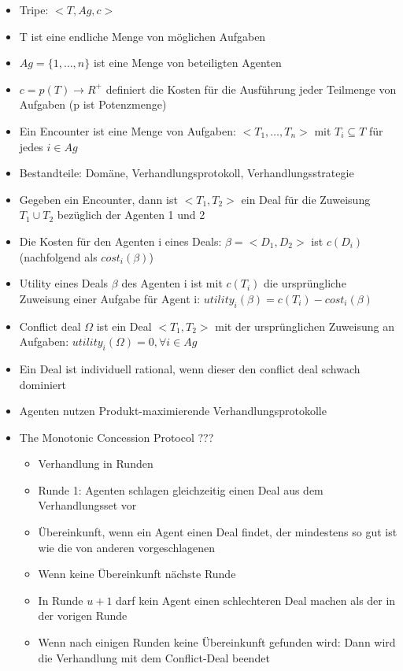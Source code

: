 \documentclass{article} %
\begin{document}
	\begin{itemize}
		\item Tripe: $<T,Ag,c>$
		\item T ist eine endliche Menge von möglichen Aufgaben
		\item $Ag=\{1,\dots,n\}$ ist eine Menge von beteiligten Agenten
		\item $c = p(T) \rightarrow R^+$ definiert die Kosten für die Ausführung jeder Teilmenge von Aufgaben (p ist Potenzmenge)
		\item Ein Encounter ist eine Menge von Aufgaben: $<T_1,\dots,T_n>$ mit $T_i \subseteq T$ für jedes $i \in Ag$
		\item Bestandteile: Domäne, Verhandlungsprotokoll, Verhandlungsstrategie
		\item Gegeben ein Encounter, dann ist $<T_1,T_2>$ ein Deal für die Zuweisung $T_1 \cup T_2$ bezüglich der Agenten 1 und 2
		\item Die Kosten für den Agenten i eines Deals: $\beta = <D_1,D_2>$ ist $c(D_i)$ (nachfolgend als $cost_i(\beta)$)
		\item Utility eines Deals $\beta$ des Agenten i ist mit $c(T_i)$ die ursprüngliche Zuweisung einer Aufgabe für Agent i: $utility_i(\beta) = c(T_i)-cost_i(\beta)$
		\item Conflict deal $\Omega$ ist ein Deal $<T_1,T_2>$ mit der ursprünglichen Zuweisung an Aufgaben: $utility_i(\Omega) = 0, \forall i \in Ag$
		\item Ein Deal ist individuell rational, wenn dieser den conflict deal schwach dominiert
		\item Agenten nutzen Produkt-maximierende Verhandlungsprotokolle
		\item The Monotonic Concession Protocol ???
		\begin{itemize}
			\item Verhandlung in Runden
			\item Runde 1: Agenten schlagen gleichzeitig einen Deal aus dem Verhandlungsset vor
			\item Übereinkunft, wenn ein Agent einen Deal findet, der mindestens so gut ist wie die von anderen vorgeschlagenen
			\item Wenn keine Übereinkunft nächste Runde
			\item In Runde $u+1$ darf kein Agent einen schlechteren Deal machen als der in der vorigen Runde
			\item Wenn nach einigen Runden keine Übereinkunft gefunden wird: Dann wird die Verhandlung mit dem Conflict-Deal beendet
		\end{itemize}

\end{itemize}
\end{document}
